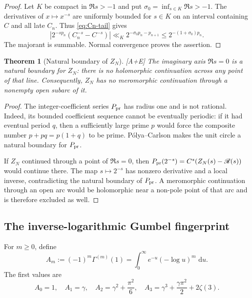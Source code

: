 \documentclass[11pt]{article}
\newtheorem{theorem}{Theorem}[section]
\theoremstyle{definition}
\theoremstyle{remark}
\newcommand{\status}[1]{\textnormal{\textcolor{accent}{\footnotesize[#1]}}}
\newcommand{\dd}{\,\mathrm d}
\begin{document}
\begin{proof}
Let $K$ be compact in $\Re s>-1$ and put
$\sigma_0=\inf_{s\in K}\Re s>-1$.  The derivatives of $x\mapsto x^{-s}$ are
uniformly bounded for $s\in K$ on an interval containing $C$ and all late $C_n$.
Thus \eqref{eq:Cn-tail} gives
\[
 |2^{-sp_n}(C_n^{-s}-C^{-s})|
 \ll_K2^{-\sigma_0p_n-p_{n+1}}
 \le2^{-(1+\sigma_0)p_n}.
\]
The majorant is summable.  Normal convergence proves the assertion.
\end{proof}

\begin{theorem}[Natural boundary of $Z_N$]\label{thm:ZN-natural-boundary}
\status{A+E}
The imaginary axis $\Re s=0$ is a natural boundary for $Z_N$: there is no holomorphic
continuation across any point of that line.  Consequently, $Z_N$ has no meromorphic
continuation through a nonempty open subarc of it.
\end{theorem}

\begin{proof}
The integer-coefficient series $P_{\rm pr}$ has radius one and is not rational.  Indeed,
its bounded coefficient sequence cannot be eventually periodic: if it had eventual
period $q$, then a sufficiently large prime $p$ would force the composite number
$p+pq=p(1+q)$ to be prime.  P\'olya--Carlson \cite{Polya,Carlson} makes the unit
circle a natural boundary for $P_{\rm pr}$.

If $Z_N$ continued through a point of $\Re s=0$, then
$P_{\rm pr}(2^{-s})=C^s(Z_N(s)-\mathscr R(s))$ would continue there.  The map
$s\mapsto2^{-s}$ has nonzero derivative and a local inverse, contradicting the natural
boundary of $P_{\rm pr}$.  A meromorphic continuation through an open arc would be
holomorphic near a non-pole point of that arc and is therefore excluded as well.
\end{proof}

\subsection{The inverse-logarithmic Gumbel fingerprint}

For $m\ge0$, define
\begin{equation}\label{eq:Gumbel-moments}
 A_m:=(-1)^m\Gamma^{(m)}(1)
 =\int_0^\infty e^{-u}(-\log u)^m\,\dd u.
\end{equation}
The first values are
\begin{equation}\label{eq:first-Gumbel-moments}
 A_0=1,\quad A_1=\gamma,\quad
 A_2=\gamma^2+\frac{\pi^2}{6},\quad
 A_3=\gamma^3+\frac{\gamma\pi^2}{2}+2\zeta(3).
\end{equation}
\end{document}
